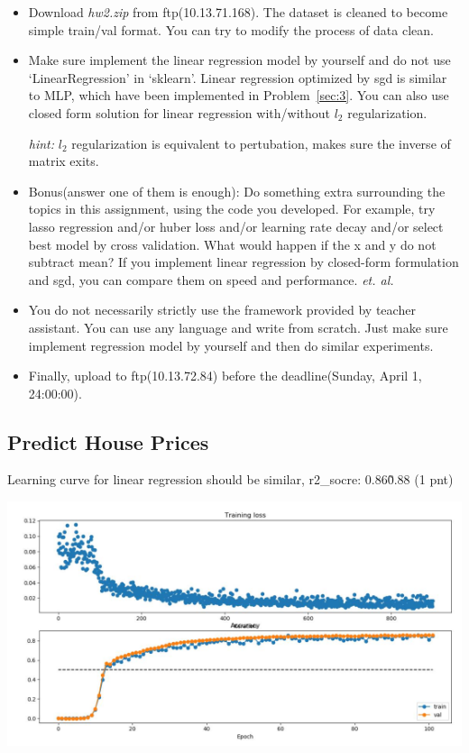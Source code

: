 \documentclass[12pt]{article}
\begin{document}
\begin{itemize}
	\item  Download \textit{hw2.zip} from ftp(10.13.71.168). The dataset is cleaned to become simple train/val format. You can try to modify the process of data clean.
	\item Make sure implement the {linear} regression model by yourself and do not use {{`LinearRegression' in `sklearn'}}.  Linear regression optimized by sgd is similar to MLP, which have been implemented in {Problem~\ref{sec:3}}. You can also use closed form solution for linear regression with/without $l_2$ regularization.

	      \textit{hint:} $l_2$ regularization is equivalent to pertubation, makes sure the inverse of matrix exits.

	\item {{Bonus(answer one of them is enough)}}: Do something extra surrounding the topics in this assignment, using the code you developed. For example, try lasso regression and/or huber loss and/or learning rate decay and/or select best model by cross validation. What would happen if the x and y do not subtract mean? If you implement linear  regression by  closed-form formulation and sgd, you can compare them on speed and performance. \textit{et. al.}

	\item You do not necessarily strictly use the framework provided by teacher assistant. You can use any language and write from scratch. Just make sure implement regression model by yourself and then do similar experiments.
	\item Finally, upload to ftp(10.13.72.84) before the deadline(Sunday, April 1, 24:00:00).
\end{itemize}

\subsection{Predict House Prices}

Learning curve for linear regression  should be similar, r2\_socre: 0.86\~0.88 (1 pnt)

\includegraphics[width=.5\textwidth]{fig/2018-04-03-17-03-44.png}
\end{document}
